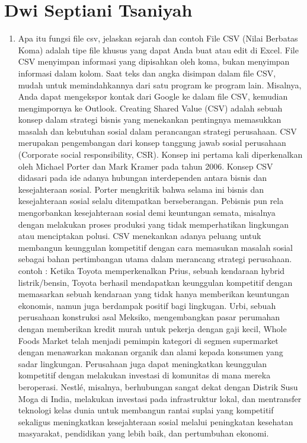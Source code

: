 \section{ Dwi Septiani Tsaniyah }
\begin{enumerate}
\item Apa itu fungsi file csv, jelaskan sejarah dan contoh
File CSV (Nilai Berbatas Koma) adalah tipe file khusus yang dapat Anda buat atau edit di Excel. File CSV menyimpan informasi yang dipisahkan oleh koma, bukan menyimpan informasi dalam kolom. Saat teks dan angka disimpan dalam file CSV, mudah untuk memindahkannya dari satu program ke program lain. Misalnya, Anda dapat mengekspor kontak dari Google ke dalam file CSV, kemudian mengimpornya ke Outlook.
Creating Shared Value (CSV) adalah sebuah konsep dalam strategi bisnis yang menekankan pentingnya memasukkan masalah dan kebutuhan sosial dalam perancangan strategi perusahaan. CSV merupakan pengembangan dari konsep tanggung jawab sosial perusahaan (Corporate social responsibility, CSR). Konsep ini pertama kali diperkenalkan oleh Michael Porter dan Mark Kramer pada tahun 2006. Konsep CSV didasari pada ide adanya hubungan interdependen antara bisnis dan kesejahteraan sosial. Porter mengkritik bahwa selama ini bisnis dan kesejahteraan sosial selalu ditempatkan berseberangan. Pebisnis pun rela mengorbankan kesejahteraan sosial demi keuntungan semata, misalnya dengan melakukan proses produksi yang tidak memperhatikan lingkungan atau menciptakan polusi. CSV menekankan adanya peluang untuk membangun keunggulan kompetitif dengan cara memasukan masalah sosial sebagai bahan pertimbangan utama dalam merancang strategi perusahaan.
contoh : Ketika Toyota memperkenalkan Prius, sebuah kendaraan hybrid listrik/bensin, Toyota berhasil mendapatkan keunggulan kompetitif dengan memasarkan sebuah kendaraan yang tidak hanya memberikan keuntungan ekonomis, namun juga berdampak positif bagi lingkugan. Urbi, sebuah perusahaan konstruksi asal Meksiko, mengembangkan pasar perumahan dengan memberikan kredit murah untuk pekerja dengan gaji kecil, Whole Foods Market telah menjadi pemimpin kategori di segmen supermarket dengan menawarkan makanan organik dan alami kepada konsumen yang sadar lingkungan. Perusahaan juga dapat meningkatkan keunggulan kompetitif dengan melakukan investasi di komunitas di mana mereka beroperasi. Nestlé, misalnya, berhubungan sangat dekat dengan Distrik Susu Moga di India, melakukan investasi pada infrastruktur lokal, dan mentransfer teknologi kelas dunia untuk membangun rantai suplai yang kompetitif sekaligus meningkatkan kesejahteraan sosial melalui peningkatan kesehatan masyarakat, pendidikan yang lebih baik, dan pertumbuhan ekonomi.

\end{enumerate}
